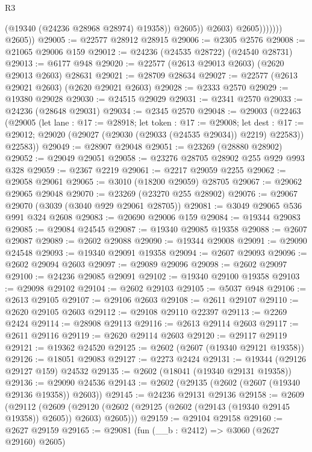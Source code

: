 \begin{lexlean}{R3}
\begin{coremodule}
                              (@19340 (@24236 @28968 @28974) @19358))
                            @2605))
                        @2603)
                      @2605)))))))
        @2605))
@29005 := @22577 @28912 @28915
@29006 := @2305 @2576
@29008 := @21065 @29006 @159
@29012 := @24236 (@24535 @28722) (@24540 @28731)
@29013 := @6177 @948
@29020 := @22577 (@2613 @29013 @2603) (@2620 @29013 @2603) @28631
@29021 := @28709 @28634
@29027 := @22577 (@2613 @29021 @2603) (@2620 @29021 @2603)
@29028 := @2333 @2570
@29029 := @19380 @29028
@29030 := @24515 @29029
@29031 := @2341 @2570
@29033 := @24236 (@28648 @29031)
@29034 := @2345 @2570
@29048 := @29003
    (@22463
      (@29005
        (let lane : @17 := @28918;
        let token : @17 := @29008;
        let dest : @17 := @29012; @29020 (@29027 (@29030 (@29033 (@24535 @29034)) @2219) @22583))
        @22583))
@29049 := @28907 @29048
@29051 := @23269 (@28880 @28902)
@29052 := @29049 @29051
@29058 := @23276 @28705 @28902 @255 @929 @993 @328
@29059 := @2367 @2219
@29061 := @2217 @29059 @2255
@29062 := @29058 @29061
@29065 := @3010 (@18200 @29059) @28705
@29067 := @29062 @29065 @29048
@29070 := @23269 (@23270 @255 @28902)
@29076 := @29067 @29070 (@3039 (@3040 @929 @29061 @28705))
@29081 := @3049 @29065 @536 @991 @324 @2608
@29083 := @20690 @29006 @159
@29084 := @19344 @29083
@29085 := @29084 @24545
@29087 := @19340 @29085 @19358
@29088 := @2607 @29087
@29089 := @2602 @29088
@29090 := @19344 @29008
@29091 := @29090 @24548
@29093 := @19340 @29091 @19358
@29094 := @2607 @29093
@29096 := @2602 @29094 @2603
@29097 := @29089 @29096
@29098 := @2602 @29097
@29100 := @24236 @29085 @29091
@29102 := @19340 @29100 @19358
@29103 := @29098 @29102
@29104 := @2602 @29103
@29105 := @5037 @948
@29106 := @2613 @29105
@29107 := @29106 @2603
@29108 := @2611 @29107
@29110 := @2620 @29105 @2603
@29112 := @29108 @29110 @22397
@29113 := @2269 @2424
@29114 := @28908 @29113
@29116 := @2613 @29114 @2603
@29117 := @2611 @29116
@29119 := @2620 @29114 @2603
@29120 := @29117 @29119
@29121 := @19362 @24520
@29125 := @2602 (@2607 (@19340 @29121 @19358))
@29126 := @18051 @29083
@29127 := @2273 @2424
@29131 := @19344 (@29126 @29127 @159) @24532
@29135 := @2602 (@18041 (@19340 @29131 @19358))
@29136 := @29090 @24536
@29143 := @2602 (@29135 (@2602 (@2607 (@19340 @29136 @19358)) @2603))
@29145 := @24236 @29131 @29136
@29158 := @2609
    (@29112
      (@2609 (@29120 (@2602 (@29125 (@2602 (@29143 (@19340 @29145 @19358)) @2605)) @2603) @2605)))
@29159 := @29104 @29158
@29160 := @2627 @29159
@29165 := @29081 (fun (__b : @2412) => @3060 (@2627 @29160) @2605)

\end{coremodule}
\end{lexlean}
